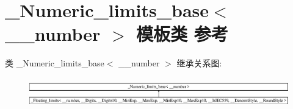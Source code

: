 \hypertarget{class___numeric__limits__base}{}\section{\+\_\+\+Numeric\+\_\+limits\+\_\+base$<$ \+\_\+\+\_\+number $>$ 模板类 参考}
\label{class___numeric__limits__base}
类 \+\_\+\+Numeric\+\_\+limits\+\_\+base$<$ \+\_\+\+\_\+number $>$ 继承关系图\+:\begin{figure}[H]
\begin{center}
\leavevmode
\includegraphics[height=1.306885cm]{class___numeric__limits__base}
\end{center}
\end{figure}
